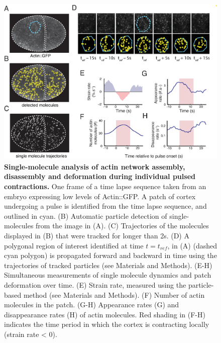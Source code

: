 \begin{figure}[!htbp]
\centering
\includegraphics[width=1\textwidth]{pulse/Figure2-2}

\caption{\label{fig:222}\textbf{Single-molecule analysis of actin network assembly, disassembly and deformation during individual pulsed contractions.} One frame of a time lapse sequence taken from an embryo expressing low levels of Actin::GFP. A patch of cortex undergoing a pulse is identified from the time lapse sequence, and outlined in cyan. (B) Automatic particle detection of single-molecules from the image in (A). (C) Trajectories of the molecules displayed in (B) that were tracked for longer than 2s. (D) A polygonal region of interest identified at time $t = t_{ref}$, in (A) (dashed cyan polygon) is propagated forward and backward in time using the trajectories of tracked particles (see Materials and Methods). (E-H) Simultaneous measurements of single molecule dynamics and patch deformation over time. (E) Strain rate, measured using the particle-based method (see Materials and Methods). (F) Number of actin molecules in the patch. (G-H) Appearance rates (G) and disappearance rates (H) of actin molecules. Red shading in (F-H) indicates the time period in which the cortex is contracting locally (strain rate < 0).}
\end{figure}


